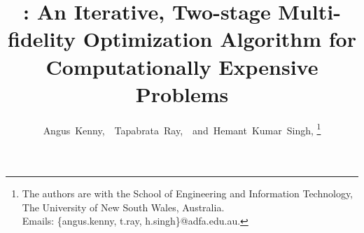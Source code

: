 \documentclass[journal]{IEEEtran}
\begin{document}
%
\title{\AlgName{}: An Iterative, Two-stage Multi-fidelity Optimization Algorithm for Computationally Expensive Problems}
%
%
%


\author{Angus~Kenny,~~Tapabrata~Ray,~~and~Hemant~Kumar~Singh, %
\thanks{The authors are with the School of Engineering and Information Technology, The University of New South Wales, Australia.\\Emails: \{angus.kenny, t.ray, h.singh\}@adfa.edu.au.}}
\end{document}
